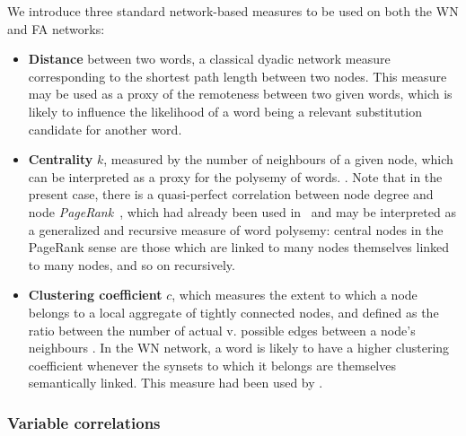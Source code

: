 \bigskip
We introduce three standard network-based measures to be used on both the WN and FA networks:

\begin{itemize}
    \item \textbf{Distance} between two words, a classical dyadic network measure corresponding to the shortest path length between two nodes.
    This measure may be used as a proxy of the remoteness between two given words, which is likely to influence the likelihood of a word being a relevant substitution candidate for another word.
    \item \textbf{Centrality} $k$, measured by the number of neighbours of a given node, which can be interpreted as a proxy for the polysemy of words.
    .
    Note that in the present case, there is a quasi-perfect correlation between node degree and node \emph{PageRank}~\citep{Page99}, which had already been used in~\citet{Griffiths07} and may be interpreted as a generalized and recursive measure of word polysemy: central nodes in the PageRank sense are those which are linked to many nodes themselves linked to many nodes, and so on recursively.
    \item \textbf{Clustering coefficient} $c$, which measures the extent to which a node belongs to a local aggregate of tightly connected nodes, and defined as the ratio between the number of actual v. possible edges between a node's neighbours \cite{watt-coll}. In the WN network, a word is likely to have a higher clustering coefficient whenever the synsets to which it belongs are themselves semantically linked.
    This measure had been used by \citet{Chan10}.
\end{itemize}


\subsubsection{Variable correlations}

